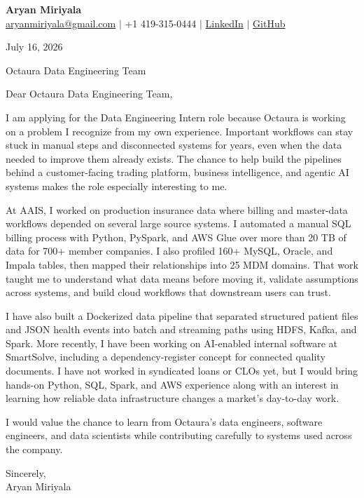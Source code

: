 \documentclass[letterpaper,11pt]{article}
\begin{document}
{\Large\textbf{Aryan Miriyala}}\\
\href{mailto:aryanmiriyala@gmail.com}{aryanmiriyala@gmail.com} $|$ +1 419-315-0444 $|$
\href{https://www.linkedin.com/in/aryan-miriyala-7788a21b6/}{LinkedIn} $|$
\href{https://github.com/aryanmiriyala}{GitHub}

July 16, 2026

Octaura Data Engineering Team

Dear Octaura Data Engineering Team,

I am applying for the Data Engineering Intern role because Octaura is working on a problem I recognize from my own experience. Important workflows can stay stuck in manual steps and disconnected systems for years, even when the data needed to improve them already exists. The chance to help build the pipelines behind a customer-facing trading platform, business intelligence, and agentic AI systems makes the role especially interesting to me.

At AAIS, I worked on production insurance data where billing and master-data workflows depended on several large source systems. I automated a manual SQL billing process with Python, PySpark, and AWS Glue over more than 20 TB of data for 700+ member companies. I also profiled 160+ MySQL, Oracle, and Impala tables, then mapped their relationships into 25 MDM domains. That work taught me to understand what data means before moving it, validate assumptions across systems, and build cloud workflows that downstream users can trust.

I have also built a Dockerized data pipeline that separated structured patient files and JSON health events into batch and streaming paths using HDFS, Kafka, and Spark. More recently, I have been working on AI-enabled internal software at SmartSolve, including a dependency-register concept for connected quality documents. I have not worked in syndicated loans or CLOs yet, but I would bring hands-on Python, SQL, Spark, and AWS experience along with an interest in learning how reliable data infrastructure changes a market's day-to-day work.

I would value the chance to learn from Octaura's data engineers, software engineers, and data scientists while contributing carefully to systems used across the company.

Sincerely,\\
Aryan Miriyala
\end{document}

